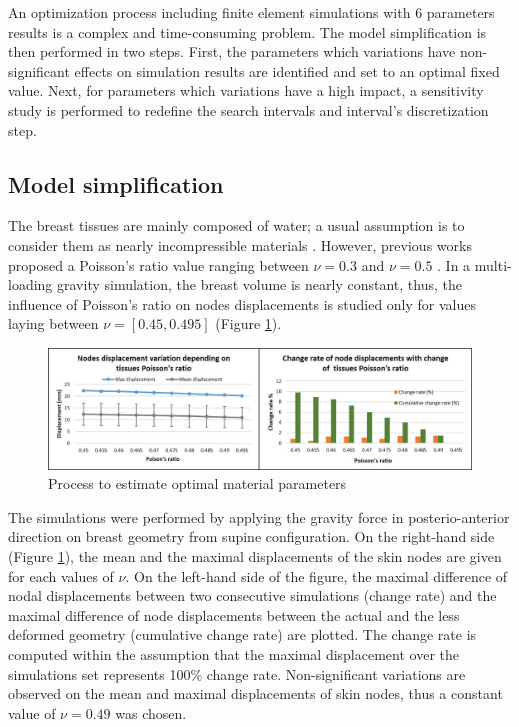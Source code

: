  An optimization process including finite element simulations with 6 parameters results is a complex and time-consuming problem. The model simplification is then performed in two steps. First, the parameters which variations have non-significant effects on simulation results are identified and set to an optimal fixed value. Next, for parameters which variations have a high impact, a sensitivity study is performed to redefine the search intervals and interval's discretization step.
 
 \subsection{Model simplification}

The breast tissues are mainly composed of water; a usual assumption is to consider them as nearly incompressible materials \citep{fung_biomechanics_2013}. However,
previous works proposed a Poisson's ratio value ranging between $\nu = 0.3$ \citep{hopp_automatic_2013} and $\nu = 0.5$ \citep{gamage_modelling_2012}. In a multi-loading gravity simulation, the breast volume is nearly constant, thus, the influence of Poisson's ratio on nodes displacements is studied only for values laying between $\nu = [0.45 , 0.495]$ (Figure \ref{fig:poissonRatio}). 

\begin{figure}[!h]
\centering
\includegraphics[width=\textwidth,keepaspectratio]{figures/poissonRatio.jpg} 
\caption{Process to estimate optimal material parameters}\label{fig:poissonRatio}
\end{figure}

The simulations were performed by applying the gravity force in posterio-anterior direction on breast geometry from supine configuration. On the right-hand side (Figure \ref{fig:poissonRatio}), the mean and the maximal displacements of the skin nodes are given for each values of $\nu$. On the left-hand side of the figure, the maximal difference of nodal displacements between two consecutive simulations (change rate) and the maximal difference of node displacements between the actual and the less deformed geometry (cumulative change rate) are plotted. The change rate is computed within the assumption that the maximal displacement over the simulations set represents 100\% change rate. Non-significant variations are observed on the mean and maximal displacements of skin nodes, thus a constant value of $\nu = 0.49$ was chosen.


